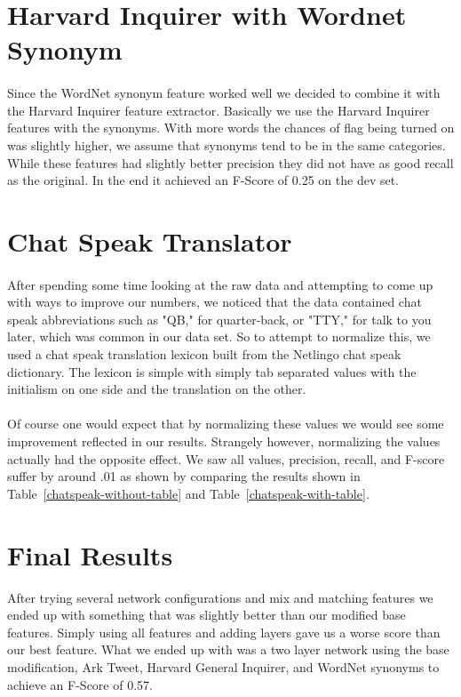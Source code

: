 \documentclass[11pt,letterpaper]{article}
\begin{document}
\section{Harvard Inquirer with Wordnet Synonym}
\paragraph{}
Since the WordNet synonym feature worked well we decided to combine it with the Harvard Inquirer feature extractor. Basically we use the Harvard Inquirer features with the synonyms. With more words the chances of flag being turned on was slightly higher, we assume that synonyms tend to be in the same categories. While these features had slightly better precision they did not have as good recall as the original. In the end it achieved an F-Score of 0.25 on the dev set.

\section{Chat Speak Translator}
\paragraph{}
After spending some time looking at the raw data and attempting to come up with ways to improve our numbers, we noticed that the data contained chat speak abbreviations such as "QB," for quarter-back, or "TTY," for talk to you later, which was common in our data set. So to attempt to normalize this, we used a chat speak translation lexicon built from the Netlingo chat speak dictionary. The lexicon is simple with simply tab separated values with the initialism on one side and the translation on the other.
\paragraph{}
Of course one would expect that by normalizing these values we would see some improvement reflected in our results. Strangely however, normalizing the values actually had the opposite effect. We saw all values, precision, recall, and F-score suffer by around .01 as shown by comparing the results shown in Table~\ref{chatspeak-without-table} and Table~\ref{chatspeak-with-table}.



\section{Final Results}
After trying several network configurations and mix and matching features we ended up with something that was slightly better than our modified base features. Simply using all features and adding layers gave us a worse score than our best feature. What we ended up with was a two layer network using the base modification, Ark Tweet, Harvard General Inquirer, and WordNet synonyms to achieve an F-Score of 0.57.
\end{document}
